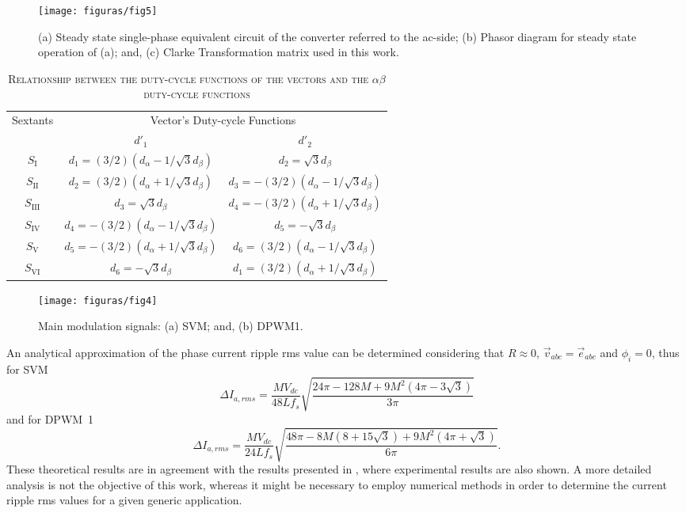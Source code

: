 \documentclass[10pt, onecolumn,conference]{IEEEtran}
\begin{document}
%
\begin{figure}[t!]
	\centering
	\texttt{[image: figuras/fig5]}
	\caption{{(a) Steady state single-phase equivalent circuit of the converter referred to the ac-side; (b) Phasor diagram for steady state operation of (a); and, (c) Clarke Transformation matrix used in this work. }}
	\label{fig5}
\end{figure}
% 
\begin{table}
\caption{ \footnotesize \textsc{Relationship between the duty-cycle functions of the vectors and the $\alpha\beta$ duty-cycle functions} }
\footnotesize
\begin{center}
\begin{tabular}{c | c | c}
\hline
\multirow{2}{*}{Sextants}  & \multicolumn{2}{c}{Vector's Duty-cycle Functions} \\
\cline{2-3}
 & $d'_1$ & $d'_2$\\
\hline
$S_\textrm{I}$ & $d_1=(3/2)( d_\alpha-{1}/{\sqrt{3}d_\beta} )$ & $d_2=\sqrt{3}d_\beta$ \\
\hline
$S_\textrm{II}$ & $d_2=(3/2)( d_\alpha+{1}/{\sqrt{3}d_\beta} )$ & $d_3=-(3/2)( d_\alpha-{1}/{\sqrt{3}d_\beta} )$\\
\hline
$S_\textrm{III}$ & $d_3=\sqrt{3}d_\beta$ & $d_4=-(3/2)( d_\alpha+{1}/{\sqrt{3}d_\beta} )$\\
\hline
$S_\textrm{IV}$ & $d_4=-(3/2)( d_\alpha-{1}/{\sqrt{3}d_\beta} )$ & $d_5=-\sqrt{3}d_\beta$\\
\hline
$S_\textrm{V}$ & $d_5=-(3/2)( d_\alpha+{1}/{\sqrt{3}d_\beta} )$ & $d_6=(3/2)( d_\alpha-{1}/{\sqrt{3}d_\beta} )$\\
\hline
$S_\textrm{VI}$ & $d_6=-\sqrt{3}d_\beta$ & $d_1=(3/2)( d_\alpha+{1}/{\sqrt{3}d_\beta} )$\\
\hline
\end{tabular}
\end{center}
\label{tab:dfunctions}
\end{table}
%
\begin{figure}[tp!]
	\centering
	\texttt{[image: figuras/fig4]}
	\caption{Main modulation signals: (a) SVM; and, (b) DPWM1.}
	\label{fig4}
\end{figure}

An analytical approximation of the phase current ripple rms value can be determined considering that $R\!\approx\!0$, $\vec{v}_{abc}\!=\!\vec{e}_{abc}$ and $\phi_i\!=\!0$, thus for SVM
%
\begin{equation}
\Delta I_{a,rms}=\dfrac{MV_{dc}}{48Lf_s}\sqrt{\dfrac{24\pi-128M+9M^2(4\pi-3\sqrt{3})}{3\pi}}
\end{equation} and for DPWM~1
%
\begin{equation}
\Delta I_{a,rms}=\dfrac{MV_{dc}}{24Lf_s}\sqrt{\dfrac{48\pi-8M(8+15\sqrt{3})+9M^2(4\pi+\sqrt{3})}{6\pi}}.
\end{equation} {These theoretical results are in agreement with the results presented in \cite{Kolar-06, Lipo-02}, where  experimental results \cite{Lipo-02} are also shown. A more detailed analysis is not the objective of this work, whereas it might be necessary to employ numerical methods in order to determine the current ripple rms values for a given generic application. }
\end{document}
